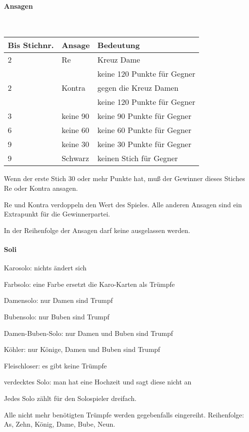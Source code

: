 \documentclass[11pt,twocolumn,landscape]{scrartcl}
\begin{document}
\pagebreak
\paragraph{Ansagen}~

\begin{tabular}{lll}
Bis Stichnr. & Ansage & Bedeutung\\\hline
2 & Re  & Kreuz Dame \\
  &     & keine 120 Punkte für Gegner\\
2 & Kontra & gegen die Kreuz Damen \\
  &        & keine 120 Punkte für Gegner\\
3 & keine 90 & keine 90 Punkte für Gegner\\
6 & keine 60 & keine 60 Punkte für Gegner\\
9 & keine 30 & keine 30 Punkte für Gegner\\
9 & Schwarz & keinen Stich für Gegner\\
\end{tabular}

Wenn der erste Stich 30 oder mehr Punkte hat, muß der Gewinner dieses Stiches
Re oder Kontra ansagen.

Re und Kontra verdoppeln den Wert des Spieles. Alle anderen Ansagen sind ein
Extrapunkt für die Gewinnerpartei.

In der Reihenfolge der Ansagen darf keine ausgelassen werden.

\paragraph{Soli}
\begin{compactdesc}
\item[Karosolo:] nichts ändert sich
\item[Farbsolo:] eine Farbe ersetzt die Karo-Karten als Trümpfe
\item[Damensolo:] nur Damen sind Trumpf
\item[Bubensolo:] nur Buben sind Trumpf
\item[Damen-Buben-Solo:] nur Damen und Buben sind Trumpf
\item[Köhler:] nur Könige, Damen und Buben sind Trumpf
\item[Fleischloser:] es gibt keine Trümpfe
\item[verdecktes Solo:] man hat eine Hochzeit und sagt diese nicht an
\end{compactdesc}

Jedes Solo zählt für den Solospieler dreifach.

Alle nicht mehr benötigten Trümpfe werden gegebenfalls eingereiht. Reihenfolge:
As, Zehn, König, Dame, Bube, Neun.
\end{document}
